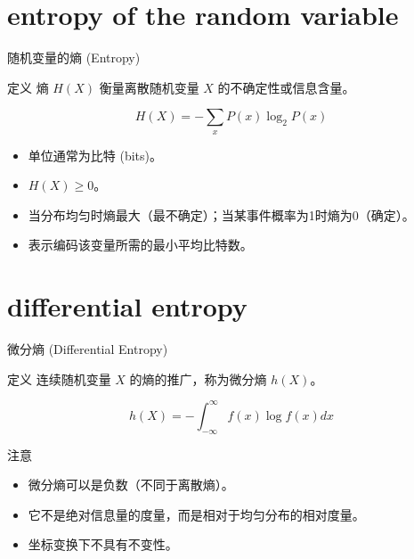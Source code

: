 \documentclass[12pt, t, aspectratio=169]{beamer}
\begin{document}
\section{entropy of the random variable}
\begin{frame}{随机变量的熵 (Entropy)}
    \begin{block}{定义}
        熵 $H(X)$ 衡量离散随机变量 $X$ 的不确定性或信息含量。
    \end{block}
    
    \begin{equation*}
        H(X) = - \sum_{x} P(x) \log_2 P(x)
    \end{equation*}
    
    \vspace{0.2cm}
    \begin{itemize}
        \item 单位通常为比特 (bits)。
        \item $H(X) \geq 0$。
        \item 当分布均匀时熵最大（最不确定）；当某事件概率为1时熵为0（确定）。
        \item 表示编码该变量所需的最小平均比特数。
    \end{itemize}
\end{frame}

\section{differential entropy}
\begin{frame}{微分熵 (Differential Entropy)}
    \begin{block}{定义}
        连续随机变量 $X$ 的熵的推广，称为微分熵 $h(X)$。
    \end{block}
    
    \begin{equation*}
        h(X) = - \int_{-\infty}^{\infty} f(x) \log f(x) dx
    \end{equation*}
    
    \vspace{0.2cm}
    \begin{alertblock}{注意}
        \begin{itemize}
            \item 微分熵可以是负数（不同于离散熵）。
            \item 它不是绝对信息量的度量，而是相对于均匀分布的相对度量。
            \item 坐标变换下不具有不变性。
        \end{itemize}
    \end{alertblock}
\end{frame}
\end{document}

